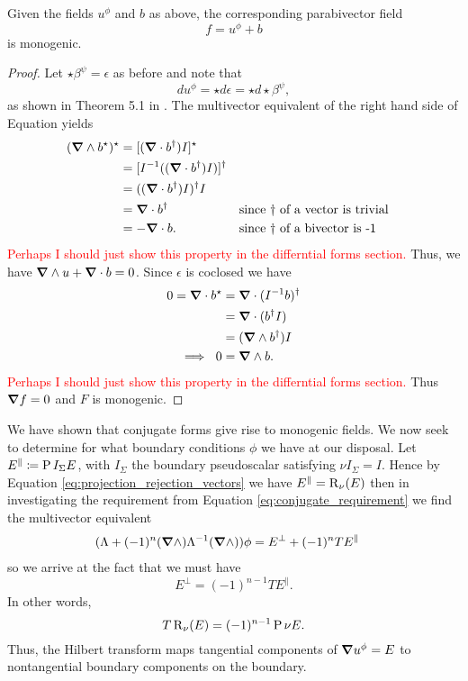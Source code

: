 \begin{lemma}
Given the fields $u^\phi$ and $b$ as above, the corresponding parabivector field
\[
f=u^\phi +b
\]
is monogenic.
\end{lemma}
\begin{proof}
Let $\star \beta^\psi = \epsilon$ as before and note that 
\begin{equation}
\label{eq:conjugate_belishev}
d u^\phi = \star d \epsilon = \star d \star \beta^\psi,  
\end{equation}
as shown in Theorem 5.1 in \cite{belishev_dirichlet_2008}. The multivector equivalent of the right hand side of Equation \cite{eq:conjugate_belishev} yields
\begin{align*}
(\boldsymbol{\nabla} \wedge b^\star )^\star &= [(\boldsymbol{\nabla} \cdot b^\dagger) I]^\star\\
    &= [I^{-1} ((\boldsymbol{\nabla} \cdot b^\dagger) I)]^\dagger\\
    &= ((\boldsymbol{\nabla} \cdot b^\dagger)I)^\dagger I\\
    &= \boldsymbol{\nabla} \cdot b^\dagger && \textrm{since $\dagger$ of a vector is trivial}\\
    &= -\boldsymbol{\nabla} \cdot b. && \textrm{since $\dagger$ of a bivector is -1}
\end{align*}
\textcolor{red}{Perhaps I should just show this property in the differntial forms section.} Thus, we have $\boldsymbol{\nabla} \wedge u + \boldsymbol{\nabla} \cdot b = 0$. Since $\epsilon$ is coclosed we have
\begin{align*}
0=\boldsymbol{\nabla} \cdot b^\star &= \boldsymbol{\nabla} \cdot (I^{-1} b)^\dagger \\
    &= \boldsymbol{\nabla} \cdot (b^\dagger I)\\
    &= (\boldsymbol{\nabla} \wedge b^\dagger) I\\
  \implies ~0  &= \boldsymbol{\nabla} \wedge b.
\end{align*}
\textcolor{red}{Perhaps I should just show this property in the differntial forms section.} Thus $\boldsymbol{\nabla} f =0$ and $F$ is monogenic.
\end{proof}

We have shown that conjugate forms give rise to monogenic fields.  We now seek to determine for what boundary conditions $\phi$ we have at our disposal. Let $E^\parallel \coloneqq \operatorname{P}{I_\Sigma}{E}$, with $I_\Sigma$ the boundary pseudoscalar satisfying $\nu I_\Sigma = I$. Hence by Equation \ref{eq:projection_rejection_vectors} we have $E^\parallel = \operatorname{R}_{\nu}(E)$ then in investigating the requirement from Equation \ref{eq:conjugate_requirement} we find the multivector equivalent
\begin{align*}
    (\Lambda + (-1)^n (\boldsymbol{\nabla} \wedge) \Lambda^{-1} (\boldsymbol{\nabla} \wedge))\phi &= E^\perp + (-1)^n T E^\parallel
\end{align*}
so we arrive at the fact that we must have
\[
E^\perp = (-1)^{n-1} T E^\parallel.
\]
In other words,
\[
T  \operatorname{R}_\nu(E)= (-1)^{n-1}\operatorname{P}{\nu}{E}.
\]
Thus, the Hilbert transform maps tangential components of $\boldsymbol{\nabla} u^\phi = E$ to nontangential boundary components on the boundary.

